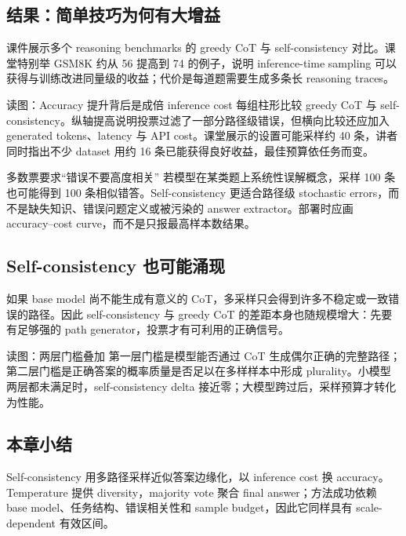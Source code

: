 \subsection{结果：简单技巧为何有大增益}

课件展示多个 reasoning benchmarks 的 greedy CoT 与 self-consistency 对比。课堂特别举 GSM8K 约从 56 提高到 74 的例子，说明 inference-time sampling 可以获得与训练改进同量级的收益；代价是每道题需要生成多条长 reasoning traces。


\begin{knowledgebox}{读图：Accuracy 提升背后是成倍 inference cost}
每组柱形比较 greedy CoT 与 self-consistency。纵轴提高说明投票过滤了一部分路径级错误，但横向比较还应加入 generated tokens、latency 与 API cost。课堂展示的设置可能采样约 40 条，讲者同时指出不少 dataset 用约 16 条已能获得良好收益，最佳预算依任务而变。
\end{knowledgebox}

\begin{warningbox}{多数票要求“错误不要高度相关”}
若模型在某类题上系统性误解概念，采样 100 条也可能得到 100 条相似错答。Self-consistency 更适合路径级 stochastic errors，而不是缺失知识、错误问题定义或被污染的 answer extractor。部署时应画 accuracy--cost curve，而不是只报最高样本数结果。
\end{warningbox}


\subsection{Self-consistency 也可能涌现}

如果 base model 尚不能生成有意义的 CoT，多采样只会得到许多不稳定或一致错误的路径。因此 self-consistency 与 greedy CoT 的差距本身也随规模增大：先要有足够强的 path generator，投票才有可利用的正确信号。


\begin{knowledgebox}{读图：两层门槛叠加}
第一层门槛是模型能否通过 CoT 生成偶尔正确的完整路径；第二层门槛是正确答案的概率质量是否足以在多样样本中形成 plurality。小模型两层都未满足时，self-consistency delta 接近零；大模型跨过后，采样预算才转化为性能。
\end{knowledgebox}

\subsection{本章小结}

Self-consistency 用多路径采样近似答案边缘化，以 inference cost 换 accuracy。Temperature 提供 diversity，majority vote 聚合 final answer；方法成功依赖 base model、任务结构、错误相关性和 sample budget，因此它同样具有 scale-dependent 有效区间。

